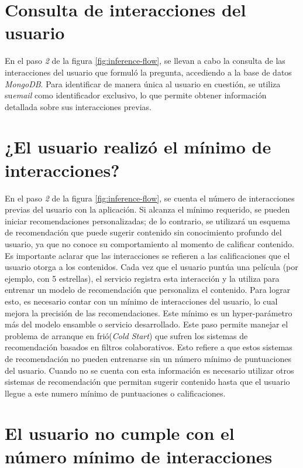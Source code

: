 \documentclass[11pt,a4paper,twoside]{thesis}
\begin{document}
\section{Consulta de interacciones del usuario}

En el paso \textit{2} de la figura \ref{fig:inference-flow}, se llevan a cabo la consulta de las interacciones del usuario que formuló la pregunta, accediendo a la base de datos \textit{MongoDB}. Para identificar de manera única al usuario en cuestión, se utiliza su\textit{email} como identificador exclusivo, lo que permite obtener información detallada sobre sus interacciones previas.


\section{¿El usuario realizó el mínimo de interacciones?}

En el paso \textit{2} de la figura \ref{fig:inference-flow}, se cuenta el número de interacciones previas del usuario con la aplicación. Si alcanza el mínimo requerido, se pueden iniciar recomendaciones personalizadas; de lo contrario, se utilizará un esquema de recomendación que puede sugerir contenido sin conocimiento profundo del usuario, ya que no conoce su comportamiento al momento de calificar contenido. Es importante aclarar que las interacciones se refieren a las calificaciones que el usuario otorga a los contenidos. Cada vez que el usuario puntúa una película (por ejemplo, con 5 estrellas), el servicio registra esta interacción y la utiliza para entrenar un modelo de recomendación que personaliza el contenido. Para lograr esto, es necesario contar con un mínimo de interacciones del usuario, lo cual mejora la precisión de las recomendaciones. Este mínimo es un hyper-parámetro más del modelo ensamble o servicio desarrollado. Este paso permite manejar el problema de arranque en frió(\textit{Cold Start}) que sufren los sistemas de recomendación basados en filtros colaborativos. Esto refiere a que estos sistemas de recomendación no pueden entrenarse sin un número mínimo de puntuaciones del usuario. Cuando no se cuenta con esta información es necesario utilizar otros sistemas de recomendación que permitan sugerir contenido hasta que el usuario llegue a este numero mínimo de puntuaciones o calificaciones.

\section{El usuario no cumple con el número mínimo de interacciones}
\end{document}
